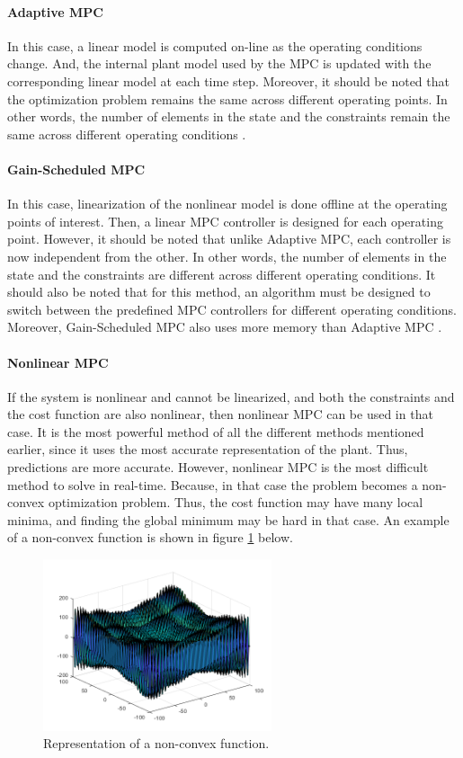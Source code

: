 \documentclass{thesisreport}
\begin{document}
\paragraph{Adaptive MPC} In this case, a linear model is computed on-line as the operating conditions change. And, the internal plant model used by the MPC is updated with the corresponding linear model at each time step. Moreover, it should be noted that the optimization problem remains the same across different operating points. In other words, the number of elements in the state and the constraints remain the same across different operating conditions \cite{Bujarbaruah2018}.

\paragraph{Gain-Scheduled MPC} In this case, linearization of the nonlinear model is done offline at the operating points of interest. Then, a linear MPC controller is designed for each operating point. However, it should be noted that unlike Adaptive MPC, each controller is now independent from the other. In other words, the number of elements in the state and the constraints are different across different operating conditions.
It should also be noted that for this method, an algorithm must be designed to switch between the predefined MPC controllers for different operating conditions. Moreover, Gain-Scheduled MPC also uses more memory than Adaptive MPC \cite{7347864}.

\paragraph{Nonlinear MPC} If the system is nonlinear and cannot be linearized, and both the constraints and the cost function are also nonlinear, then nonlinear MPC can be used in that case. It is the most powerful method of all the different methods mentioned earlier, since it uses the most accurate representation of the plant. Thus, predictions are more accurate. However, nonlinear MPC is the most difficult method to solve in real-time. Because, in that case the problem becomes a non-convex optimization problem. Thus, the cost function may have many local minima, and finding the global minimum may be hard in that case. An example of a non-convex function is shown in figure \ref{nonconvex_function} below.


\begin{figure}[h]
\centering
\includegraphics[width=0.6\textwidth]{Images/Control/MPC_Nonconvex_Equation_b}
\caption{Representation of a non-convex function.}
\label{nonconvex_function}
\end{figure}
\end{document}
